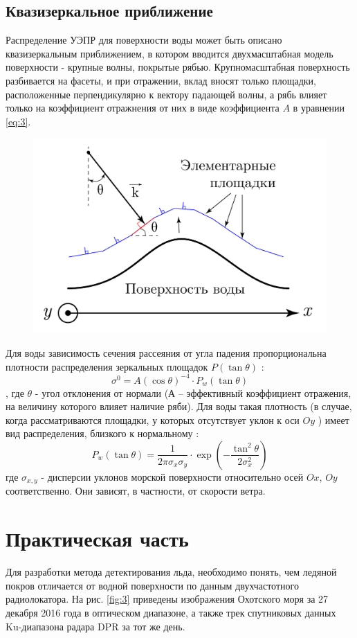 \subsection{Квазизеркальное приближение}
Распределение УЭПР для поверхности воды может быть описано квазизеркальным приближением, в котором вводится двухмасштабная
модель поверхности - крупные волны, покрытые рябью. Крупномасштабная поверхность разбивается на
фасеты, и при отражении, вклад вносят только площадки, расположенные перпендикулярно к вектору падающей волны, а рябь
влияет только на коэффициент отражнения от них в виде коэффициента $A$ в уравнении \eqref{eq:3}.

\begin{figure}[h!]
  \centering
  \includegraphics[width = .6\linewidth]{img/quaz.pdf}
  \caption{}
  \label{fig:2}
\end{figure}

Для воды зависимость сечения рассеяния от угла падения пропорциональна плотности распределения зеркальных площадок
$P(\tan \theta)$  \cite{bassfuks}:
\begin{equation}
  \sigma^0 = A (\cos \theta)^{-4} \cdot P_w(\tan \theta)
  \label{eq:3}
\end{equation}
, где $\theta$ - угол отклонения от нормали (А – эффективный коэффициент отражения, на величину которого влияет наличие
ряби). Для воды такая плотность (в случае, когда рассматриваются площадки, у которых отсутствует уклон к оси $Oy$
) имеет вид распределения, близкого к нормальному \cite{masha}:
\begin{equation}
  P_w(\tan \theta) = \frac{1}{ 2 \pi \sigma_x \sigma_y } \cdot \exp (- \frac{\tan^2\theta}{2 \sigma^2_x})
  \label{eq:4}
\end{equation}
где $\sigma_{x,y}$ - дисперсии уклонов морской поверхности относительно осей $Ox$, $Oy$ соответственно. Они зависят, в
частности, от скорости ветра.

\section{Практическая часть}
Для разработки метода детектирования льда, необходимо понять, чем ледяной покров отличается от водной поверхности по
данным двухчастотного радиолокатора. На рис. \ref{fig:3} приведены изображения Охотского моря за 27 декабря 2016
года в оптическом диапазоне, а также трек спутниковых данных Ku-диапазона радара DPR за тот же день.

